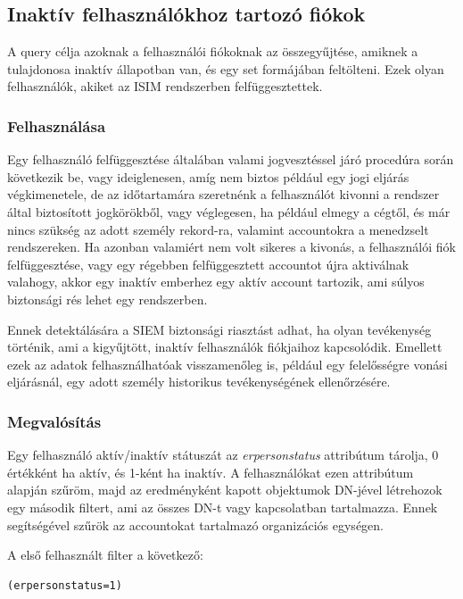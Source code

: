 	
\subsection{Inaktív felhasználókhoz tartozó fiókok}
	A query célja azoknak a felhasználói fiókoknak az összegyűjtése, amiknek a tulajdonosa inaktív állapotban van, és egy set formájában feltölteni. Ezek olyan felhasználók, akiket az ISIM rendszerben felfüggesztettek.
	\subsubsection{Felhasználása}
	
		Egy felhasználó felfüggesztése általában valami jogvesztéssel járó procedúra során következik be, vagy ideiglenesen, amíg nem biztos például egy jogi eljárás végkimenetele, de az időtartamára szeretnénk a felhasználót kivonni a rendszer által biztosított jogkörökből, vagy véglegesen, ha például elmegy a cégtől, és már nincs szükség az adott személy rekord-ra, valamint accountokra a menedzselt rendszereken.
		Ha azonban valamiért nem volt sikeres a kivonás, a felhasználói fiók felfüggesztése, vagy egy régebben felfüggesztett accountot újra aktiválnak valahogy, akkor egy inaktív emberhez egy aktív account tartozik, ami súlyos biztonsági rés lehet egy rendszerben.

		Ennek detektálására a SIEM biztonsági riasztást adhat, ha olyan tevékenység történik, ami a kigyűjtött, inaktív felhasználók fiókjaihoz kapcsolódik. Emellett ezek az adatok felhasználhatóak visszamenőleg is, például egy felelősségre vonási eljárásnál, egy adott személy historikus tevékenységének ellenőrzésére.
		 
	\subsubsection{Megvalósítás}
		
		Egy felhasználó aktív/inaktív státuszát az \textit{erpersonstatus} attribútum tárolja, 0 értékként ha aktív, és 1-ként ha inaktív. A felhasználókat ezen attribútum alapján szűröm, majd az eredményként kapott objektumok DN-jével létrehozok egy második filtert, ami az összes DN-t vagy kapcsolatban tartalmazza. Ennek segítségével szűrök az accountokat tartalmazó organizációs egységen.
		
		A első felhasznált filter a következő:
		\begin{lstlisting}
(erpersonstatus=1)\end{lstlisting}
		
